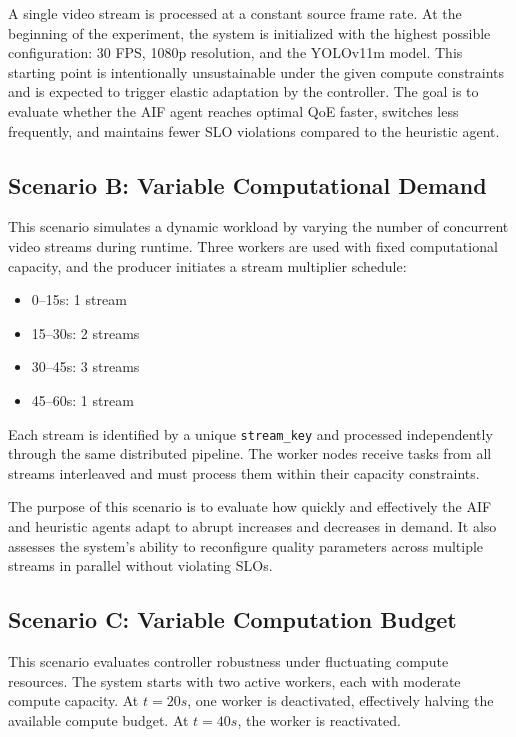 A single video stream is processed at a constant source frame rate. At the beginning of the experiment, the system is initialized with the highest possible configuration: 30 FPS, 1080p resolution, and the YOLOv11m model. This starting point is intentionally unsustainable under the given compute constraints and is expected to trigger elastic adaptation by the controller. The goal is to evaluate whether the AIF agent reaches optimal QoE faster, switches less frequently, and maintains fewer SLO violations compared to the heuristic agent.

\subsection{Scenario B: Variable Computational Demand}
\label{sec:evaluation-variable-demand}

This scenario simulates a dynamic workload by varying the number of concurrent video streams during runtime. Three workers are used with fixed computational capacity, and the producer initiates a stream multiplier schedule:

\begin{itemize}
    \item 0–15s: 1 stream
    \item 15–30s: 2 streams
    \item 30–45s: 3 streams
    \item 45–60s: 1 stream
\end{itemize}

Each stream is identified by a unique \texttt{stream\_key} and processed independently through the same distributed pipeline. The worker nodes receive tasks from all streams interleaved and must process them within their capacity constraints.

The purpose of this scenario is to evaluate how quickly and effectively the AIF and heuristic agents adapt to abrupt increases and decreases in demand. It also assesses the system’s ability to reconfigure quality parameters across multiple streams in parallel without violating SLOs.

\subsection{Scenario C: Variable Computation Budget}
\label{sec:evaluation-variable-budget}

This scenario evaluates controller robustness under fluctuating compute resources. The system starts with two active workers, each with moderate compute capacity. At \( t = 20s \), one worker is deactivated, effectively halving the available compute budget. At \( t = 40s \), the worker is reactivated.

